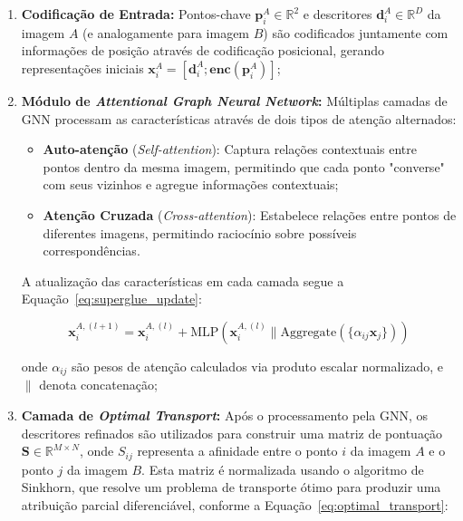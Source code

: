 \begin{enumerate}
    \item \textbf{Codificação de Entrada:} Pontos-chave $\mathbf{p}_i^A \in \mathbb{R}^2$ e descritores $\mathbf{d}_i^A \in \mathbb{R}^D$ da imagem $A$ (e analogamente para imagem $B$) são codificados juntamente com informações de posição através de codificação posicional, gerando representações iniciais $\mathbf{x}_i^A = [\mathbf{d}_i^A; \mathbf{enc}(\mathbf{p}_i^A)]$;
    
    \item \textbf{Módulo de \textit{Attentional Graph Neural Network}:} Múltiplas camadas de GNN processam as características através de dois tipos de atenção alternados:
    
    \begin{itemize}
        \item \textbf{Auto-atenção} (\textit{Self-attention}): Captura relações contextuais entre pontos dentro da mesma imagem, permitindo que cada ponto "converse" com seus vizinhos e agregue informações contextuais;
        
        \item \textbf{Atenção Cruzada} (\textit{Cross-attention}): Estabelece relações entre pontos de diferentes imagens, permitindo raciocínio sobre possíveis correspondências.
    \end{itemize}
    
    A atualização das características em cada camada segue a Equação~\ref{eq:superglue_update}:
    
    \begin{equation}
    \label{eq:superglue_update}
    \mathbf{x}_i^{A,(l+1)} = \mathbf{x}_i^{A,(l)} + \text{MLP}(\mathbf{x}_i^{A,(l)} \| \text{Aggregate}(\{\alpha_{ij}\mathbf{x}_j\}))
    \end{equation}
    
    \noindent onde $\alpha_{ij}$ são pesos de atenção calculados via produto escalar normalizado, e $\|$ denota concatenação;
    
    \item \textbf{Camada de \textit{Optimal Transport}:} Após o processamento pela GNN, os descritores refinados são utilizados para construir uma matriz de pontuação $\mathbf{S} \in \mathbb{R}^{M \times N}$, onde $S_{ij}$ representa a afinidade entre o ponto $i$ da imagem $A$ e o ponto $j$ da imagem $B$. Esta matriz é normalizada usando o algoritmo de Sinkhorn, que resolve um problema de transporte ótimo para produzir uma atribuição parcial diferenciável, conforme a Equação~\ref{eq:optimal_transport}:
    

\end{enumerate}
